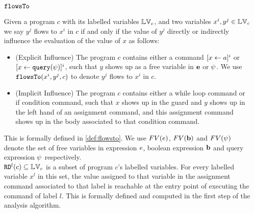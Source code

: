 \subsubsection{$\mathtt{flowsTo}$}
Given a program  ${c}$ with its labelled variables $\mathbb{LV}_c$,
and two variables ${x^i}, y^j  \in \mathbb{LV}_c $ 
we say $y^j$ flows to ${x^i}$ in ${c}$ if and only if 
the value of $y^j$ directly or indirectly influence the evaluation of the value of ${x}$ as follows:
%
\begin{itemize}
\item (Explicit Influence) The program ${c}$ contains either 
a command $[\mathrel{ {x} \leftarrow a }]^i$ or $[\mathrel{ {x} \leftarrow {\tt query}({\psi}) }]^i$,
such that ${y}$ shows up as a free variable in ${\boldsymbol{\mathbf{e}}}$ or ${\psi}$.
We use $\mathtt{flowsTo}({x^i, y^j, c})$ to denote $y^j$ flows to $x^i$ in ${c}$.
%
\item (Implicit Influence) The program ${c}$ contains either a while loop
command
or if condition command, 
such that $x$ shows up in the guard
and $y$ shows up in the left hand of an assignment command, and this assignment command shows up
 in the body associated to that condition command.
\end{itemize}
%
This is formally defined in \ref{def:flowsto}.
We use $FV(e)$, $FV({\boldsymbol{\mathbf{b}}})$ and $FV(\psi)$ denote the set of free variables in 
expression $e$, boolean expression ${\boldsymbol{\mathbf{b}}}$ and query expression $\psi$ respectively.
%
\\
$\mathtt{RD}^l(c) \subseteq \mathbb{LV}_c$ 
is a subset of program $c$'s labelled variables.
For every labelled variable $x^l$ in this set, 
the value assigned to that variable
in the assignment command associated to that label is reachable at the entry point of  executing the command of label $l$.
This is formally defined and computed in the first step of the analysis algorithm.
%
